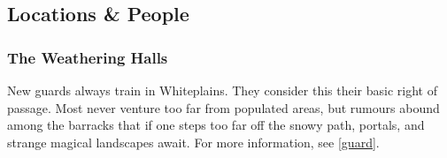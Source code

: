 \begin{multicols}{2}
{\subsection{Locations \& People}

}

\subsubsection{The  Weathering Halls}

New guards always train in Whiteplains.
They consider this their basic right of passage.
Most never venture too far from populated areas, but rumours abound among the barracks that if one steps too far off the snowy path, portals, and strange magical landscapes await.
For more information, see \autoref{guard}.

\end{multicols}

\vfill\null
